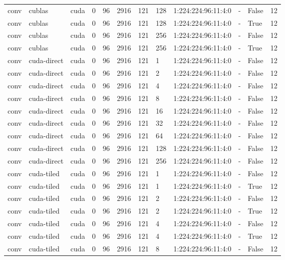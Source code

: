 \begin{tabular}{llllllllllll}
conv & cublas & cuda & 0 & 96 & 2916 & 121 & 128 & 1:224:224:96:11:4:0 & - & False & 12 \\
conv & cublas & cuda & 0 & 96 & 2916 & 121 & 128 & 1:224:224:96:11:4:0 & - & True & 12 \\
conv & cublas & cuda & 0 & 96 & 2916 & 121 & 256 & 1:224:224:96:11:4:0 & - & False & 12 \\
conv & cublas & cuda & 0 & 96 & 2916 & 121 & 256 & 1:224:224:96:11:4:0 & - & True & 12 \\
conv & cuda-direct & cuda & 0 & 96 & 2916 & 121 & 1 & 1:224:224:96:11:4:0 & - & False & 12 \\
conv & cuda-direct & cuda & 0 & 96 & 2916 & 121 & 2 & 1:224:224:96:11:4:0 & - & False & 12 \\
conv & cuda-direct & cuda & 0 & 96 & 2916 & 121 & 4 & 1:224:224:96:11:4:0 & - & False & 12 \\
conv & cuda-direct & cuda & 0 & 96 & 2916 & 121 & 8 & 1:224:224:96:11:4:0 & - & False & 12 \\
conv & cuda-direct & cuda & 0 & 96 & 2916 & 121 & 16 & 1:224:224:96:11:4:0 & - & False & 12 \\
conv & cuda-direct & cuda & 0 & 96 & 2916 & 121 & 32 & 1:224:224:96:11:4:0 & - & False & 12 \\
conv & cuda-direct & cuda & 0 & 96 & 2916 & 121 & 64 & 1:224:224:96:11:4:0 & - & False & 12 \\
conv & cuda-direct & cuda & 0 & 96 & 2916 & 121 & 128 & 1:224:224:96:11:4:0 & - & False & 12 \\
conv & cuda-direct & cuda & 0 & 96 & 2916 & 121 & 256 & 1:224:224:96:11:4:0 & - & False & 12 \\
conv & cuda-tiled & cuda & 0 & 96 & 2916 & 121 & 1 & 1:224:224:96:11:4:0 & - & False & 12 \\
conv & cuda-tiled & cuda & 0 & 96 & 2916 & 121 & 1 & 1:224:224:96:11:4:0 & - & True & 12 \\
conv & cuda-tiled & cuda & 0 & 96 & 2916 & 121 & 2 & 1:224:224:96:11:4:0 & - & False & 12 \\
conv & cuda-tiled & cuda & 0 & 96 & 2916 & 121 & 2 & 1:224:224:96:11:4:0 & - & True & 12 \\
conv & cuda-tiled & cuda & 0 & 96 & 2916 & 121 & 4 & 1:224:224:96:11:4:0 & - & False & 12 \\
conv & cuda-tiled & cuda & 0 & 96 & 2916 & 121 & 4 & 1:224:224:96:11:4:0 & - & True & 12 \\
conv & cuda-tiled & cuda & 0 & 96 & 2916 & 121 & 8 & 1:224:224:96:11:4:0 & - & False & 12 \\

\end{tabular}
